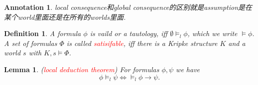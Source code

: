 \documentclass{article}
\theoremstyle{plain}
\newtheorem{lemma}[theorem]{Lemma}
\newtheorem{definition}[theorem]{Definition}
\newtheorem{annotation}[theorem]{Annotation}
\theoremstyle{nonumberplain}
\newcommand{\redt}[1]{\textcolor{red}{#1}}
\begin{document}
\begin{annotation}
\rm local consequence和global consequence的区别就是assumption是在某个world里面还是在所有的worlds里面. 
\end{annotation}

\begin{definition}
\rm A formula $\phi$ is vaild or a tautology, iff $\emptyset \vDash_l \phi$, which we write $\vDash \phi$. A set of formulas $\Phi$ is called \redt{satisifable}, iff there is a Kripke structure $K$ and a world $s$ with $K,s \vDash \Phi$. 
\end{definition}

\begin{lemma}
\rm (\redt{local deduction theorem}) For formulas $\phi, \psi$ we have 
$$
\phi \vDash_l \psi \iff \vDash_l \phi \to \psi.
$$
\end{lemma}
\end{document}
